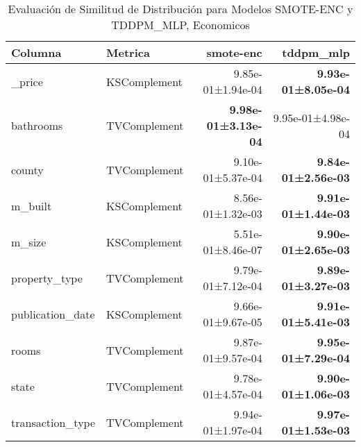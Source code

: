 \begin{table}[H]
\centering
\fontsize{10}{14}\selectfont
\caption{Evaluaci\'on de Similitud de Distribuci\'on para Modelos SMOTE-ENC y TDDPM\_MLP, Economicos}
\label{table-shape-economicos-b}
\begin{tabular}{|l|l|r|r|}
\hline
\rowcolor[gray]{0.8}
Columna & Metrica & smote-enc & tddpm\_mlp \\
\hline \_price & KSComplement & 9.85e-01±1.94e-04 & \bfseries 9.93e-01±8.05e-04 \\
\hline bathrooms & TVComplement & \bfseries 9.98e-01±3.13e-04 & 9.95e-01±4.98e-04 \\
\hline county & TVComplement & 9.10e-01±5.37e-04 & \cellcolor[rgb]{0.9, 0.54, 0.52} \bfseries 9.84e-01±2.56e-03 \\
\hline m\_built & KSComplement & 8.56e-01±1.32e-03 & \bfseries 9.91e-01±1.44e-03 \\
\hline m\_size & KSComplement & \cellcolor[rgb]{0.9, 0.54, 0.52} 5.51e-01±8.46e-07 & \bfseries 9.90e-01±2.65e-03 \\
\hline property\_type & TVComplement & 9.79e-01±7.12e-04 & \bfseries 9.89e-01±3.27e-03 \\
\hline publication\_date & KSComplement & 9.66e-01±9.67e-05 & \bfseries 9.91e-01±5.41e-03 \\
\hline rooms & TVComplement & 9.87e-01±9.57e-04 & \bfseries 9.95e-01±7.29e-04 \\
\hline state & TVComplement & 9.78e-01±4.57e-04 & \bfseries 9.90e-01±1.06e-03 \\
\hline transaction\_type & TVComplement & 9.94e-01±1.97e-04 & \bfseries 9.97e-01±1.53e-03 \\
\hline
\end{tabular}
\end{table}
